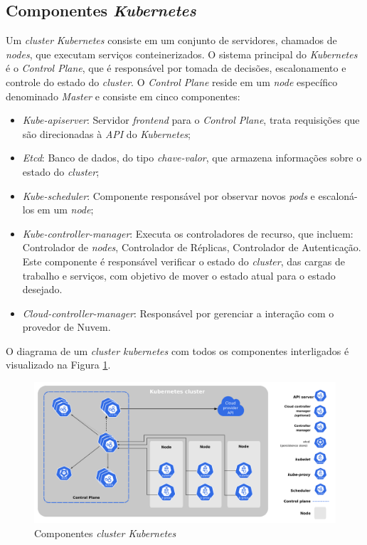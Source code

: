\subsection{Componentes \textit{Kubernetes}}
Um \textit{cluster} \textit{Kubernetes} consiste em um conjunto de servidores, chamados de \textit{nodes}, que executam serviços conteinerizados. O sistema principal do \textit{Kubernetes} é o \textit{Control Plane}, que é responsável por tomada de decisões, escalonamento e controle do estado do \textit{cluster}. O \textit{Control Plane} reside em um \textit{node} específico denominado \textit{Master} e consiste em cinco componentes:

\begin{itemize}
    \item \textit{Kube-apiserver}: Servidor \textit{frontend} para o \textit{Control Plane}, trata requisições que são direcionadas à \textit{API} do \textit{Kubernetes};
    \item \textit{Etcd}: Banco de dados, do tipo \textit{chave-valor}, que armazena informações sobre o estado do \textit{cluster};
    \item \textit{Kube-scheduler}: Componente responsável por observar novos \textit{pods} e escaloná-los em um \textit{node};
    \item \textit{Kube-controller-manager}: Executa os controladores de recurso, que incluem: Controlador de \textit{nodes}, Controlador de Réplicas, Controlador de Autenticação. Este componente é responsável verificar o estado do \textit{cluster}, das cargas de trabalho e serviços, com objetivo de mover o estado atual para o estado desejado.
    \item \textit{Cloud-controller-manager}: Responsável por gerenciar a interação com o provedor de Nuvem.
\end{itemize}

O diagrama de um \textit{cluster kubernetes} com todos os componentes interligados é visualizado na Figura \ref{fig:components_of_kubernetes}.

\begin{figure}[h!]
	\caption{\label{fig:components_of_kubernetes}Componentes \textit{cluster Kubernetes}}
	\centering
	\includegraphics[width=.84\linewidth]{assets/components-of-kubernetes.pdf}
\end{figure}

